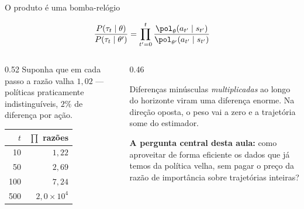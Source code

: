 \documentclass[aspectratio=169, 10pt]{beamer}
\newcommand{\thv}{\theta}
\newcommand{\polth}{\pol_{\thv}}
\newcommand{\traj}{\tau}
\begin{document}
\begin{frame}{O produto é uma bomba-relógio}

  \[
    \frac{P(\traj_t\mid\thv)}{P(\traj_t\mid\thv')}
      = \prod_{t'=0}^{t}\frac{\polth(a_{t'}\mid s_{t'})}{\pol_{\thv'}(a_{t'}\mid s_{t'})}
  \]

  \begin{columns}[T]
  \begin{column}{0.52\textwidth}
    Suponha que em cada passo a razão valha $1{,}02$ --- políticas praticamente
    indistinguíveis, $2\%$ de diferença por ação.

    \medskip
    \begin{center}\small
    \begin{tabular}{@{}rr@{}}
      \toprule
      $t$ & $\prod$ razões \\
      \midrule
      \phantom{0}10 & $1{,}22$ \\
      \phantom{0}50 & $2{,}69$ \\
      100 & $7{,}24$ \\
      500 & $2{,}0\times 10^{4}$ \\
      \bottomrule
    \end{tabular}
    \end{center}
  \end{column}
  \begin{column}{0.46\textwidth}
    \begin{alertabox}
      Diferenças minúsculas \emph{multiplicadas} ao longo do horizonte viram uma
      diferença enorme. Na direção oposta, o peso vai a zero e a trajetória some
      do estimador.
    \end{alertabox}

    \begin{ideiabox}
      \textbf{A pergunta central desta aula:}
      como aproveitar de forma eficiente os dados que já temos da política velha,
      sem pagar o preço da razão de importância sobre trajetórias inteiras?
    \end{ideiabox}
  \end{column}
  \end{columns}
\end{frame}
\end{document}
